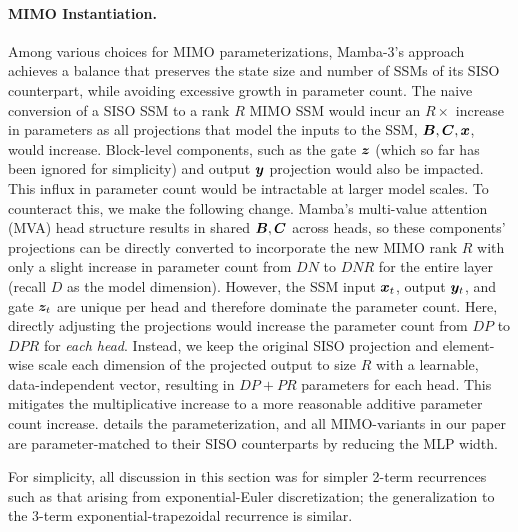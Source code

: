 \paragraph{MIMO Instantiation.}
Among various choices for MIMO parameterizations, Mamba-3's approach achieves a balance that preserves the state size and number of SSMs of its SISO counterpart, while avoiding excessive growth in parameter count.
The naive conversion of a SISO SSM to a rank $R$ MIMO SSM would incur an $R\times$ increase in parameters as all projections that model the inputs to the SSM, ${\bm{B}},{\bm{C}},{\bm{x}}$, would increase.
Block-level components, such as the gate ${\bm{z}}$ (which so far has been ignored for simplicity) and output ${\bm{y}}$ projection would also be impacted.
This influx in parameter count would be intractable at larger model scales.
To counteract this, we make the following change.
Mamba's multi-value attention (MVA) head structure results in shared ${\bm{B}}, {\bm{C}}$ across heads, so these components' projections can be directly converted to incorporate the new MIMO rank $R$ with only a slight increase in parameter count from $DN$ to $DNR$ for the entire layer (recall $D$ as the model dimension).
However, the SSM input ${\bm{x}}_t$, output ${\bm{y}}_t$, and gate ${\bm{z}}_t$ are unique per head and therefore dominate the parameter count.
Here, directly adjusting the projections would increase the parameter count from $DP$ to $DPR$ for \emph{each head}.
Instead, we keep the original SISO projection and element-wise scale each dimension of the projected output to size $R$ with a learnable, data-independent vector, resulting in $DP + PR$ parameters for each head.
This mitigates the multiplicative increase to a more reasonable additive parameter count increase. 
 details the parameterization, and all MIMO-variants in our paper are parameter-matched to their SISO counterparts by reducing the MLP width.

\begin{remark}
    For simplicity, all discussion in this section was for simpler 2-term recurrences such as that arising from exponential-Euler discretization; the generalization to the 3-term exponential-trapezoidal recurrence is similar.
\end{remark}
